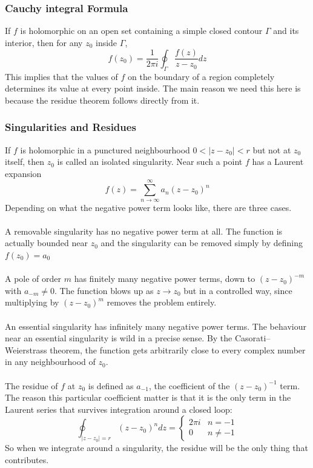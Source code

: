 \subsubsection*{Cauchy integral Formula}
If $f$ is holomorphic on an open set containing a simple closed contour $\Gamma$ and its interior, then for any $z_{0}$ inside $\Gamma$, 
\begin{equation}\label{Eq3.1.4}
    f(z_{0})=\frac{1}{2\pi i}\oint_{\Gamma}\frac{f(z)}{z-z_{0}}dz
\end{equation} This implies that the values of $f$ on the boundary of a region completely determines its value at every point inside. The main reason we need this here is because the residue theorem follows directly from it. \cite{YellowBook,ThousandPage,RedBook,ahlfors1979} 


\subsubsection*{Singularities and Residues}
If $f$ is holomorphic in a punctured neighbourhood $0<|z-z_{0}|<r$ but not at $z_{0}$ itself, then $z_{0}$ is called an isolated singularity. Near such a point $f$ has a Laurent expansion \begin{equation}\label{Eq3.1.5}
    f(z)=\sum^{\infty}_{n\rightarrow\infty}a_{n}(z-z_{0})^{n}
\end{equation}
Depending on what the negative power term looks like, there are three cases. 
\\ \\
A removable singularity has no negative power term at all. The function is actually bounded near $z_{0}$ and the singularity can be removed simply by defining $f(z_{0})=a_{0}$
\\ \\
A pole of order $m$ has finitely many negative power terms, down to $(z-z_{0})^{-m}$ with $a_{-m}\neq 0$. The function blows up as $z\rightarrow z_{0}$ but in a controlled way, since multiplying by $(z-z_{0})^{m}$ removes the problem entirely.
\\ \\
An essential singularity has infinitely many negative power terms. The behaviour near an essential singularity is wild in a precise sense. By the Casorati–Weierstrass theorem, the function gets arbitrarily close to every complex number in any neighbourhood of $z_{0}$.
\\ \\
The residue of $f$ at $z_{0}$ is defined as $a_{-1}$, the coefficient of the $(z-z_{0})^{-1}$ term. The reason this particular coefficient matter is that it is the only term in the Laurent series that survives integration around a closed loop: 
\begin{equation}\label{Eq3.1.6}
    \oint_{|z-z_{0}|=r}(z-z_{0})^{n}dz=\left\{ \begin{array}{lr}
    2\pi i & n=-1 \\
    0 & n\neq -1
\end{array}\right.
\end{equation}
So when we integrate around a singularity, the residue will be the only thing that contributes. \cite{RedBook, YellowBook,ahlfors1979}


